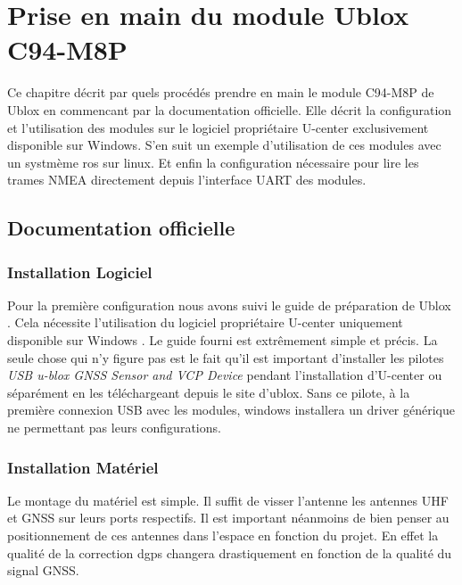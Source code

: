 
\chapter{Prise en main du module Ublox C94-M8P}

Ce chapitre décrit par quels procédés prendre en main le module C94-M8P de
Ublox en commencant par la documentation officielle. Elle décrit la
configuration et l’utilisation des modules sur le logiciel propriétaire
U-center exclusivement disponible sur Windows. S'en suit un exemple
d’utilisation de ces modules avec un systmème \gls{ros} sur
linux. Et enfin la configuration nécessaire pour lire les trames NMEA
directement depuis l'interface UART des modules.

\section{Documentation officielle}

\subsection{Installation Logiciel}

Pour la première configuration nous avons suivi le guide de préparation de
Ublox \cite{WEB08}. Cela nécessite l'utilisation du logiciel propriétaire
U-center uniquement disponible sur Windows \cite{WEB09}. Le guide fourni est
extrêmement simple et précis. La seule chose qui n'y figure pas est le fait
qu'il est important d'installer les pilotes \textit{USB u-blox GNSS Sensor and
VCP Device} pendant l'installation d'U-center ou séparément en les
téléchargeant depuis le site d'ublox. Sans ce pilote, à la première connexion
USB avec les modules, windows installera un driver générique ne permettant pas
leurs configurations.


\subsection{Installation Matériel}

Le montage du matériel est simple. Il suffit de visser l'antenne les antennes
UHF et GNSS sur leurs ports respectifs. Il est important néanmoins de bien
penser au positionnement de ces antennes dans l'espace en fonction du projet.
En effet la qualité de la correction \gls{dgps} changera drastiquement en
fonction de la qualité du signal GNSS.


